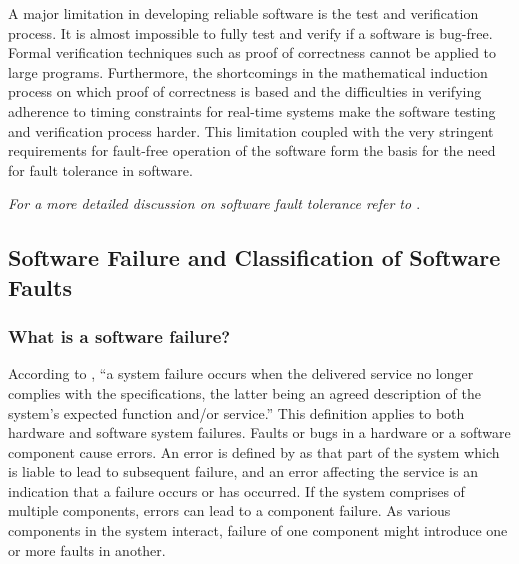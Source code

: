 \documentclass[a4paper, 11pt]{article}
\begin{document}
A major limitation in developing reliable software is the test and verification process. It is almost impossible to fully test and verify if a software is bug-free. Formal verification techniques such as proof of correctness cannot be applied to large programs. Furthermore, the shortcomings in the mathematical induction process on which proof of correctness is based and the difficulties in verifying adherence to timing constraints for real-time systems make the software testing and verification process harder. This limitation coupled with the very stringent requirements for fault-free operation of the software form the basis for the need for fault tolerance in software.

\emph{For a more detailed discussion on software fault tolerance refer to \citet{checkpointing}}.

\subsection{Software Failure and Classification of Software Faults}
\subsubsection{What is a software failure?}
According to \citet{laprie1992dependability}, ``a system failure occurs when the delivered service no longer complies with the specifications, the latter being an agreed description of the system's expected function and/or service.'' This definition applies to both hardware and software system failures. Faults or bugs in a hardware or a software component cause errors. An error is defined by \citet{laprie1992dependability} as that part of the system which is liable to lead to subsequent failure, and an error affecting the service is an indication that a failure occurs or has occurred. If the system comprises of multiple components, errors can lead to a component failure. As various components in the system interact, failure of one component might introduce one or more faults in another.

\end{document}
